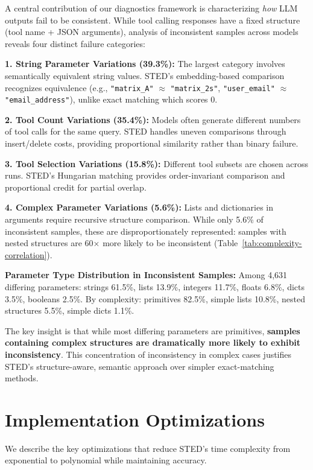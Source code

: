 \documentclass{article}
\theoremstyle{plain}
\theoremstyle{definition}
\begin{document}
A central contribution of our diagnostics framework is characterizing \textit{how} LLM outputs fail to be consistent. While tool calling responses have a fixed structure (tool name + JSON arguments), analysis of inconsistent samples across models reveals four distinct failure categories:

\textbf{1. String Parameter Variations (39.3\%):} The largest category involves semantically equivalent string values. STED's embedding-based comparison recognizes equivalence (e.g., \texttt{"matrix\_A"} $\approx$ \texttt{"matrix\_2s"}, \texttt{"user\_email"} $\approx$ \texttt{"email\_address"}), unlike exact matching which scores 0.

\textbf{2. Tool Count Variations (35.4\%):} Models often generate different numbers of tool calls for the same query. STED handles uneven comparisons through insert/delete costs, providing proportional similarity rather than binary failure.

\textbf{3. Tool Selection Variations (15.8\%):} Different tool subsets are chosen across runs. STED's Hungarian matching provides order-invariant comparison and proportional credit for partial overlap.

\textbf{4. Complex Parameter Variations (5.6\%):} Lists and dictionaries in arguments require recursive structure comparison. While only 5.6\% of inconsistent samples, these are disproportionately represented: samples with nested structures are 60$\times$ more likely to be inconsistent (Table~\ref{tab:complexity-correlation}).

\textbf{Parameter Type Distribution in Inconsistent Samples:} Among 4,631 differing parameters: strings 61.5\%, lists 13.9\%, integers 11.7\%, floats 6.8\%, dicts 3.5\%, booleans 2.5\%. By complexity: primitives 82.5\%, simple lists 10.8\%, nested structures 5.5\%, simple dicts 1.1\%.

The key insight is that while most differing parameters are primitives, \textbf{samples containing complex structures are dramatically more likely to exhibit inconsistency}. This concentration of inconsistency in complex cases justifies STED's structure-aware, semantic approach over simpler exact-matching methods.

\section{Implementation Optimizations}
\label{sec:optimizations}

We describe the key optimizations that reduce STED's time complexity from exponential to polynomial while maintaining accuracy.
\end{document}
